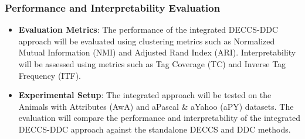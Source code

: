 \subsubsection{Performance and Interpretability Evaluation}
\begin{itemize}
\item \textbf{Evaluation Metrics}: The performance of the integrated DECCS-DDC approach will be evaluated using clustering metrics such as Normalized Mutual Information (NMI) and Adjusted Rand Index (ARI). Interpretability will be assessed using metrics such as Tag Coverage (TC) and Inverse Tag Frequency (ITF).

\item \textbf{Experimental Setup}: The integrated approach will be tested on the Animals with Attributes (AwA) and aPascal \& aYahoo (aPY) datasets. The evaluation will compare the performance and interpretability of the integrated DECCS-DDC approach against the standalone DECCS and DDC methods.
\end{itemize}

